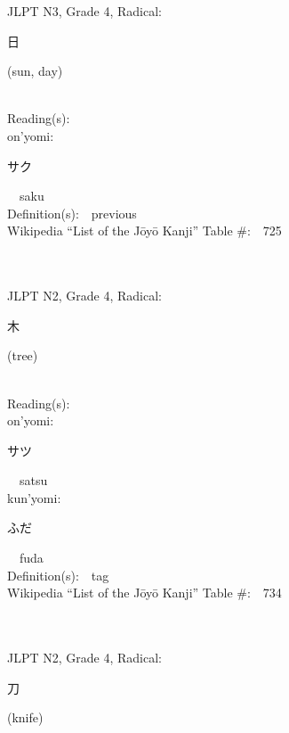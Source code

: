 \begin{multicols}{2}
{JLPT N3, Grade 4, Radical:\ \ {\begin{CJK}{UTF8}{min} 日 \end{CJK}} (sun, day) } \\
Reading(s):\ \ \\
{\hspace*{1em}}on'yomi:\ \ \\
{\hspace*{2em}}{\begin{CJK}{UTF8}{min} サク \end{CJK}}\ \ saku\ \ \\
Definition(s):\ \ previous \\
Wikipedia ``List of the J\=oy\=o Kanji'' Table \#:\ \ 725 \\
\ \ \\
{\fontsize{34pt}{40pt}  }\ \ \\  %
{JLPT N2, Grade 4, Radical:\ \ {\begin{CJK}{UTF8}{min} 木 \end{CJK}} (tree) } \\
Reading(s):\ \ \\
{\hspace*{1em}}on'yomi:\ \ \\
{\hspace*{2em}}{\begin{CJK}{UTF8}{min} サツ \end{CJK}}\ \ satsu\ \ \\
{\hspace*{1em}}kun'yomi:\ \ \\
{\hspace*{2em}}{\begin{CJK}{UTF8}{min} ふだ \end{CJK}}\ \ fuda\ \ \\
Definition(s):\ \ tag \\
Wikipedia ``List of the J\=oy\=o Kanji'' Table \#:\ \ 734 \\
\ \ \\
{\fontsize{34pt}{40pt}  }\ \ \\  %
{JLPT N2, Grade 4, Radical:\ \ {\begin{CJK}{UTF8}{min} 刀 \end{CJK}} (knife) } \\

\end{multicols}
